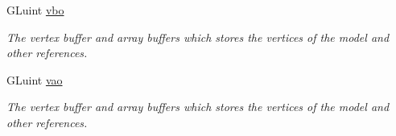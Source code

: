 {\bf }\par
\begin{DoxyCompactItemize}
\item 
G\+Luint \hyperlink{classcft_1_1Crafter_a3770da487be185aaf19b8946998e45fb}{vbo}\hypertarget{classcft_1_1Crafter_a3770da487be185aaf19b8946998e45fb}{}\label{classcft_1_1Crafter_a3770da487be185aaf19b8946998e45fb}

\begin{DoxyCompactList}\small\item\em The vertex buffer and array buffers which stores the vertices of the model and other references. \end{DoxyCompactList}\item 
G\+Luint \hyperlink{classcft_1_1Crafter_aca03f78f43b66c8e1196fbcf19a4b844}{vao}\hypertarget{classcft_1_1Crafter_aca03f78f43b66c8e1196fbcf19a4b844}{}\label{classcft_1_1Crafter_aca03f78f43b66c8e1196fbcf19a4b844}

\begin{DoxyCompactList}\small\item\em The vertex buffer and array buffers which stores the vertices of the model and other references. \end{DoxyCompactList}\end{DoxyCompactItemize}

